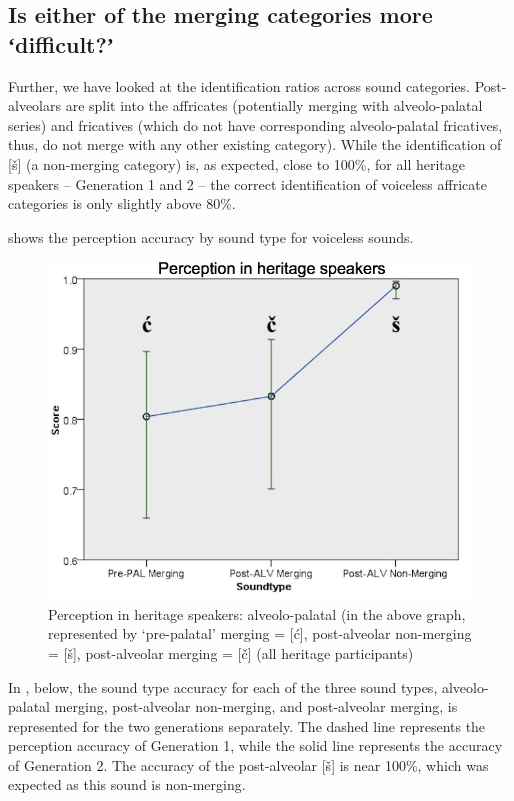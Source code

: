 \documentclass[output=paper,modfonts,nonflat,
]{langsci/langscibook}
\begin{document}
\subsection{Is either of the merging categories more ʻdifficult?ʼ}\label{sec:mihajlovic:5.4}

Further, we have looked at the identification ratios across sound categories. Post-alveolars are split into the affricates (potentially merging with alveolo-palatal series) and fricatives (which do not have corresponding alveolo-palatal fricatives, thus, do not merge with any other existing category). While the identification of [š] (a non-merging category) is, as expected, close to 100\%, for all heritage speakers \textsf{–} Generation 1 and 2 \textsf{–} the correct identification of voiceless affricate categories is only slightly above 80\%.



 shows the perception accuracy by sound type for voiceless sounds.

\begin{figure}
\includegraphics[height=.3\textheight]{figures/M_C_Figure 6.jpg}
\caption{\label{fig:mihajlovic:6} Perception in heritage speakers: alveolo-palatal (in the above graph, represented by ‘pre-palatal’ merging = [ć], post-alveolar non-merging = [š], post-alveolar merging = [č] (all heritage participants)}
\end{figure}

In , below, the sound type accuracy for each of the three sound types, alveolo-palatal merging, post-alveolar non-merging, and post-alveolar merging, is represented for the two generations separately. The dashed line represents the perception accuracy of Generation 1, while the solid line represents the accuracy of Generation 2. The accuracy of the post-alveolar [š] is near 100\%, which was expected as this sound is non-merging.
\end{document}
